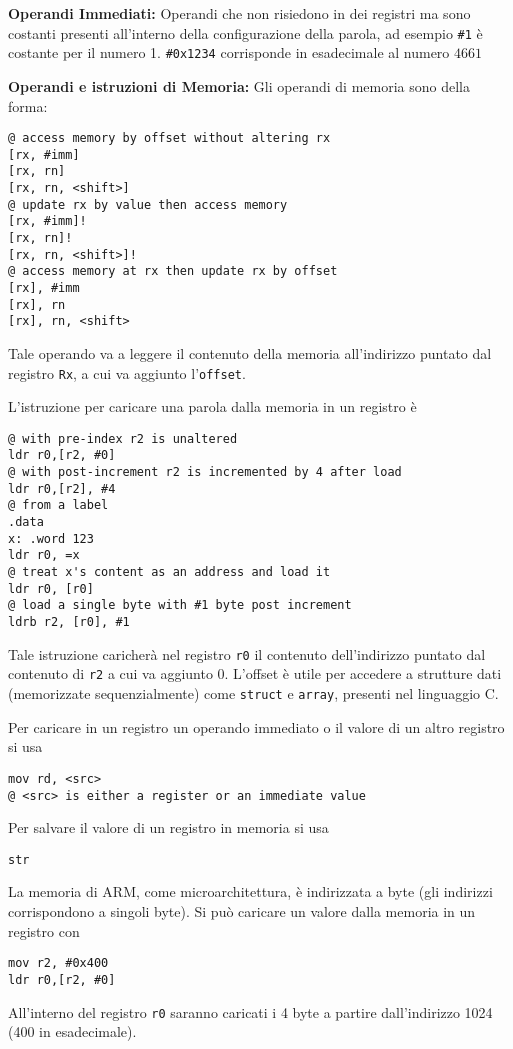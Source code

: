\begin{defn}
\textbf{Operandi Immediati:}
Operandi che non risiedono in dei registri ma sono costanti presenti all'interno della configurazione della parola, ad esempio \verb|#1| è costante per il numero 1. \verb|#0x1234| corrisponde in esadecimale al numero $ 4661 $
\end{defn}

\begin{defn}
\textbf{Operandi e istruzioni di Memoria:}
Gli operandi di memoria sono della forma:
\begin{lstlisting}[style=arm]
@ access memory by offset without altering rx
[rx, #imm]
[rx, rn]
[rx, rn, <shift>]
@ update rx by value then access memory
[rx, #imm]!
[rx, rn]!
[rx, rn, <shift>]!
@ access memory at rx then update rx by offset
[rx], #imm
[rx], rn
[rx], rn, <shift>
\end{lstlisting}

Tale operando va a leggere il contenuto della memoria all'indirizzo puntato dal registro \verb|Rx|, a cui va aggiunto l'\verb|offset|.

L'istruzione per caricare una parola dalla memoria in un registro è
\begin{lstlisting}[style=arm]
@ with pre-index r2 is unaltered
ldr r0,[r2, #0]
@ with post-increment r2 is incremented by 4 after load
ldr r0,[r2], #4
@ from a label
.data
x: .word 123
ldr r0, =x
@ treat x's content as an address and load it
ldr r0, [r0]
@ load a single byte with #1 byte post increment
ldrb r2, [r0], #1
\end{lstlisting}

Tale istruzione caricherà nel registro \verb|r0| il contenuto dell'indirizzo puntato dal contenuto di \verb|r2| a cui va aggiunto 0. L'offset è utile per accedere a strutture dati (memorizzate sequenzialmente) come \verb|struct| e \verb|array|, presenti nel linguaggio C.

Per caricare in un registro un operando immediato o il valore di un altro registro si usa
\begin{lstlisting}[style=arm]
mov rd, <src>
@ <src> is either a register or an immediate value
\end{lstlisting}

Per salvare il valore di un registro in memoria si usa
\begin{lstlisting}[style=arm]
str
\end{lstlisting}
\end{defn}

\begin{note}
La memoria di ARM, come microarchitettura, è indirizzata a byte (gli indirizzi corrispondono a singoli byte). Si può caricare un valore dalla memoria in un registro con
\begin{lstlisting}[style=arm]
mov r2, #0x400
ldr r0,[r2, #0]
\end{lstlisting}

All'interno del registro \verb|r0| saranno caricati i 4 byte a partire dall'indirizzo 1024 (400 in esadecimale).
\end{note}


